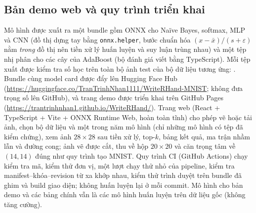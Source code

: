 \subsection{Bản demo web và quy trình triển khai}
\label{sec:demo}
Mô hình được xuất ra một bundle gồm ONNX cho Naïve Bayes, softmax, MLP và CNN (đồ thị dựng tay bằng \texttt{onnx.helper}, bước chuẩn hóa $(x-\bar x)/(s+\varepsilon)$ nằm \emph{trong} đồ thị nên tiền xử lý huấn luyện và suy luận trùng nhau) và một tệp nhị phân cho các cây của AdaBoost (bộ đánh giá viết bằng TypeScript). Mỗi tệp xuất được kiểm tra số học trên toàn bộ ảnh test của bộ dữ liệu tương ứng: . Bundle cùng model card được đẩy lên Hugging Face Hub (\url{https://huggingface.co/TranTrinhNhan1111/WriteRHand-MNIST}; không đưa trọng số lên GitHub), và trang demo được triển khai trên GitHub Pages (\url{https://trantrinhnhan1.github.io/WriteRHand/}). Trang web (React + TypeScript + Vite + ONNX Runtime Web, hoàn toàn tĩnh) cho phép vẽ hoặc tải ảnh, chọn bộ dữ liệu và một trong năm mô hình (chỉ những mô hình có tệp đã kiểm chứng), xem ảnh $28\times28$ sau tiền xử lý, top-$k$, bảng kết quả, ma trận nhầm lẫn và đường cong; ảnh vẽ được cắt, thu về hộp $20\times20$ và căn trọng tâm về $(14,14)$ đúng như quy trình tạo MNIST. Quy trình CI (GitHub Actions) chạy kiểm tra mã, kiểm thử đơn vị, một lượt chạy thử nhỏ của pipeline, kiểm tra manifest--khóa--revision từ xa khớp nhau, kiểm thử trình duyệt trên bundle đã ghim và build giao diện; không huấn luyện lại ở mỗi commit. Mô hình cho bản demo và các bảng chính vẫn là các mô hình huấn luyện trên dữ liệu gốc (không tăng cường).
